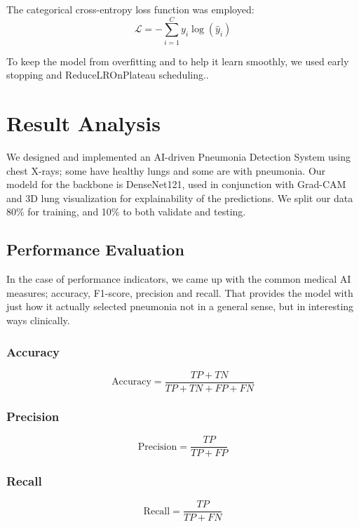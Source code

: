 \documentclass[conference]{IEEEtran}
\begin{document}
The categorical cross-entropy loss function was employed:
\begin{equation}
\mathcal{L} = -\sum_{i=1}^{C} y_i \log(\hat{y}_i)
\end{equation}

To keep the model from overfitting and to help it learn smoothly, we used early stopping and ReduceLROnPlateau scheduling..


\section{Result Analysis}

We designed and implemented an AI-driven Pneumonia Detection System using chest X-rays; some have healthy lungs and some are with pneumonia. Our modeld for the backbone is DenseNet121, used in conjunction with Grad-CAM and 3D lung visualization for explainability of the predictions. We split our data 80\% for training, and 10\% to both validate and testing.

\subsection{Performance Evaluation}

In the case of performance indicators, we came up with the common medical AI measures; accuracy, F1-score, precision and recall. That provides the model with just how it actually selected pneumonia not in a general sense, but in interesting ways clinically.

\subsubsection{Accuracy}
\begin{equation}
\text{Accuracy} = \frac{TP + TN}{TP + TN + FP + FN}
\end{equation}

\subsubsection{Precision}
\begin{equation}
\text{Precision} = \frac{TP}{TP + FP}
\end{equation}

\subsubsection{Recall}
\begin{equation}
\text{Recall} = \frac{TP}{TP + FN}
\end{equation}
\end{document}
